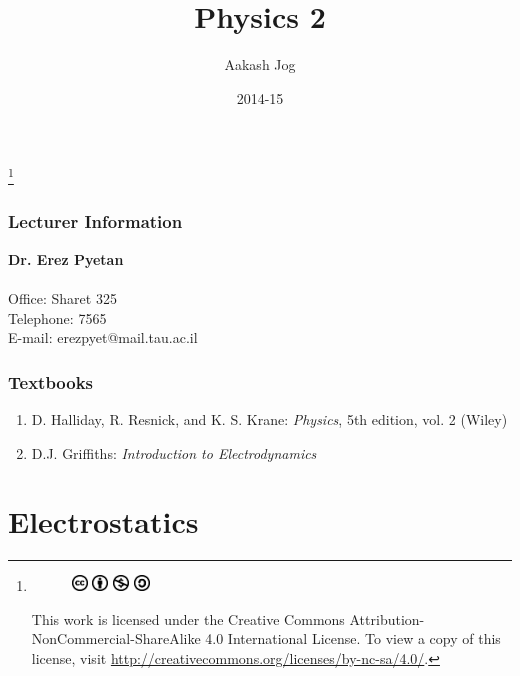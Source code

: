 \documentclass[fleqn, a4paper, 12pt, twoside]{article}
\title{Physics 2}
\author{Aakash Jog}
\date{2014-15}
\theoremstyle{definition}
\theoremstyle{theorem}
\newcommand\blfootnote[1]{%
	\begingroup
	\renewcommand\thefootnote{}\footnote{#1}%
	\addtocounter{footnote}{-1}%
	\endgroup
}
\begin{document}
\maketitle

\blfootnote
{	
	\begin{figure}[H]
		\includegraphics[height = 12pt]{cc.eps}
		\includegraphics[height = 12pt]{by.eps}
		\includegraphics[height = 12pt]{nc.eps}
		\includegraphics[height = 12pt]{sa.eps}
	\end{figure}
	This work is licensed under the Creative Commons Attribution-NonCommercial-ShareAlike 4.0 International License. To view a copy of this license, visit \url{http://creativecommons.org/licenses/by-nc-sa/4.0/}.
} %

\tableofcontents

\newpage
\section{Lecturer Information}

\textbf{Dr. Erez Pyetan}\\
~\\
Office: Sharet 325\\
Telephone: 7565\\
E-mail: erezpyet@mail.tau.ac.il\\

\section{Textbooks}

\begin{enumerate}
	\item D. Halliday, R. Resnick, and K. S. Krane: \textit{Physics}, 5th edition, vol. 2 (Wiley)
	\item D.J. Griffiths: \textit{Introduction to Electrodynamics}
\end{enumerate}

\newpage
\part{Electrostatics}
\end{document}
